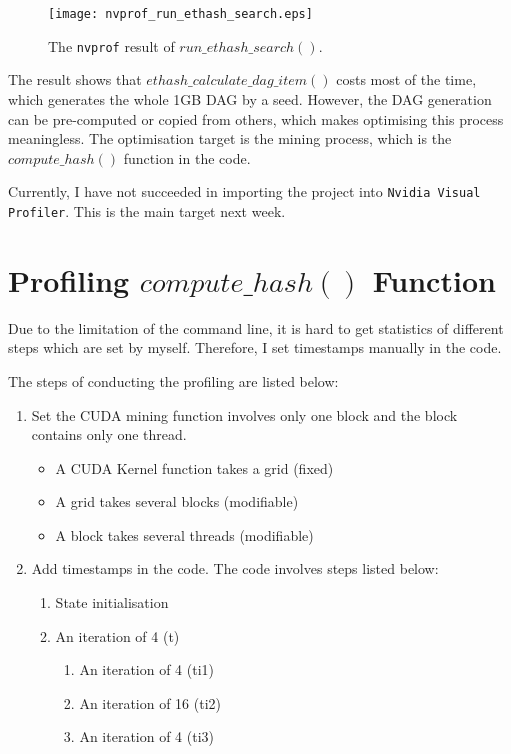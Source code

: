 \documentclass[11pt]{article}
\begin{document}
\begin{figure}[h]
    \centering
    \texttt{[image: nvprof\_run\_ethash\_search.eps]}
    \caption{The \texttt{nvprof} result of $run\_ethash\_search()$.}
    \label{fig:nvprof_run_ethash_search}
\end{figure}

The result shows that $ethash\_calculate\_dag\_item()$ costs most of the time, which generates the whole 1GB DAG by a seed. However, the DAG generation can be pre-computed or copied from others, which makes optimising this process meaningless. The optimisation target is the mining process, which is the $compute\_hash()$ function in the code.

Currently, I have not succeeded in importing the project into \texttt{Nvidia Visual Profiler}. This is the main target next week.

\section{Profiling $compute\_hash()$ Function}

Due to the limitation of the command line, it is hard to get statistics of different steps which are set by myself. Therefore, I set timestamps manually in the code.

The steps of conducting the profiling are listed below:

\begin{enumerate}
	\item Set the CUDA mining function involves only one block and the block contains only one thread. 
		\begin{itemize}
		\item A CUDA Kernel function takes a grid (fixed)
		\item A grid takes several blocks (modifiable)
		\item A block takes several threads (modifiable)
		\end{itemize}
	\item Add timestamps in the code. The code involves steps listed below:
		\begin{enumerate}
		\item State initialisation
		\item An iteration of 4 (t)
			\begin{enumerate}
			\item An iteration of 4 (ti1)
			\item An iteration of 16 (ti2)
			\item An iteration of 4 (ti3)
			\end{enumerate}
		\end{enumerate}
\end{enumerate}
\end{document}
